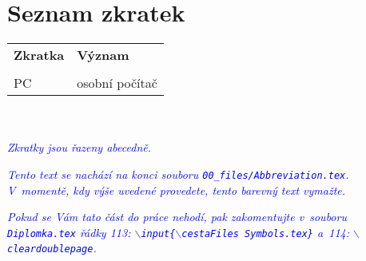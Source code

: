 ﻿\chapter*{Seznam zkratek}


\begin{tabular*}{0.95\textwidth}{ p{3cm} l}
    \textbf{Zkratka}    & \textbf{Význam}\\
    {}&{}\\
    PC                  & osobní počítač\\
\end{tabular*}




\textcolor{blue}{\em \\\\Zkratky jsou řazeny abecedně.\/}

\textcolor{blue}{\em Tento text se nachází na konci souboru \texttt{00\_files/Abbreviation.tex}. V~momentě, kdy výše uvedené provedete, tento barevný text vymažte.\/}

\textcolor{blue}{\em Pokud se Vám tato část do práce nehodí, pak zakomentujte v~souboru \texttt{Diplomka.tex} řádky 113\?: $\backslash$\texttt{input\{$\backslash$cestaFiles Symbols.tex\}} a~114\?: $\backslash$\texttt{cleardoublepage}.\/}
